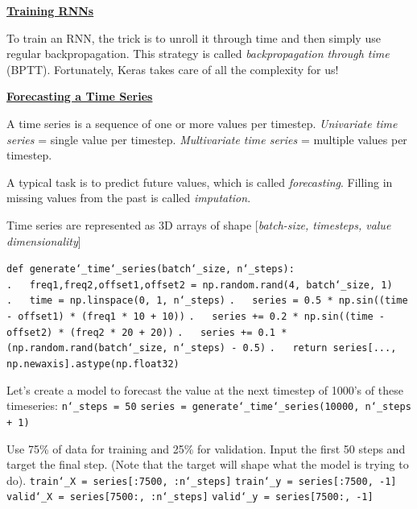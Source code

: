 \vspace{+4.0mm}
\textbf{\underline{Training RNNs}}

To train an RNN, the trick is to unroll it through time and then simply use regular backpropagation.
This strategy is called \textit{backpropagation through time} (BPTT).
Fortunately, Keras takes care of all the complexity for us!\newline

\textbf{\underline{Forecasting a Time Series}}

A time series is a sequence of one or more values per timestep.\newline
\textit{Univariate time series} = single value per timestep.\newline
\textit{Multivariate time series} = multiple values per timestep.

A typical task is to predict future values, which is called \textit{forecasting}.\newline
Filling in missing values from the past is called \textit{imputation}.

\newpage

Time series are represented as 3D arrays of shape [\textit{batch-size, timesteps, value dimensionality}]

\texttt{def generate\char`_time\char`_series(batch\char`_size, n\char`_steps):}\newline
\texttt{.~~~freq1,freq2,offset1,offset2 = np.random.rand(4, batch\char`_size, 1)}\newline
\texttt{.~~~time = np.linspace(0, 1, n\char`_steps)}\newline
\texttt{.~~~series = 0.5 * np.sin((time - offset1) * (freq1 * 10 + 10))}\newline
\texttt{.~~~series += 0.2 * np.sin((time - offset2) * (freq2 * 20 + 20))}\newline
\texttt{.~~~series += 0.1 * (np.random.rand(batch\char`_size, n\char`_steps) - 0.5)}\newline
\texttt{.~~~return series[..., np.newaxis].astype(np.float32)}\newline

Let's create a model to forecast the value at the next timestep of 1000's of these timeseries:\newline
\texttt{n\char`_steps = 50}\newline
\texttt{series = generate\char`_time\char`_series(10000, n\char`_steps + 1)}

Use 75\% of data for training and 25\% for validation.
Input the first 50 steps and target the final step. (Note that the target will shape what the model is trying to do).\newline
\texttt{train\char`_X = series[:7500, :n\char`_steps]}\newline
\texttt{train\char`_y = series[:7500, -1]}\newline
\texttt{valid\char`_X = series[7500:, :n\char`_steps]}\newline
\texttt{valid\char`_y = series[7500:, -1]}\newline

